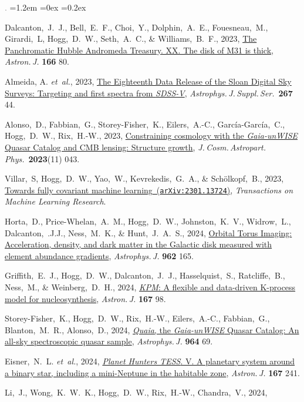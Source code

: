 \documentclass[10pt,letterpaper]{article}
\newcommand{\foreign}[1]{\textsl{#1}}
\newcommand{\etal}{\foreign{et~al.}}
\newcommand{\project}[1]{\textsl{#1}}
\newcommand{\doi}[2]{\href{http://dx.doi.org/#1}{{#2}}}
\newcommand{\arxiv}[2]{\href{http://arxiv.org/abs/#1}{{#2}\ (\texttt{arXiv:#1})}}
\newcommand{\deemph}[1]{\textcolor{grey}{\footnotesize{#1}}}
\newcommand{\pubnumber}[1]{\deemph{{#1}.}}
\newcounter{refpubnum}
\newcommand{\hogglist}{%
    \rightmargin=0in
    \leftmargin=1.2em
    \topsep=0ex
    \partopsep=0pt
    \itemsep=0.2ex
    \parsep=0pt
    \itemindent=-1.0\leftmargin
    \listparindent=0.0\leftmargin
    \settowidth{\labelsep}{~}
    \usecounter{refpubnum}
  }
\begin{document}
\begin{list}{\pubnumber{\therefpubnum}}{\hogglist}
\item
  Dalcanton,~J.~J., Bell,~E.~F., Choi,~Y., Dolphin,~A.~E., Fouesneau,~M., Girardi,~L,
  Hogg,~D.~W., Seth,~A.~C., \& Williams,~B.~F., 2023,
  \doi{10.3847/1538-3881/accc83}{The Panchromatic Hubble Andromeda Treasury. XX. The disk of M31 is thick},
  \textit{Astron.\,J.} \textbf{166} 80.
\item
  Almeida, A. \etal, 2023,
  \doi{10.3847/1538-4365/acda98}{The Eighteenth Data Release of the Sloan Digital Sky Surveys: Targeting and first spectra from \project{SDSS-V}},
  \textit{Astrophys.\,J.\,Suppl.\,Ser.}\ \textbf{267} 44.
\item
  Alonso,~D., Fabbian,~G., Storey-Fisher,~K., Eilers,~A.-C., Garc\'ia-Garc\'ia,~C.,
  Hogg,~D.~W., Rix,~H.-W., 2023,
  \doi{10.1088/1475-7516/2023/11/043}{Constraining cosmology with the \project{Gaia-unWISE} Quasar Catalog and CMB lensing: Structure growth},
  \textit{J.\,Cosm.\,Astropart.\,Phys.}\ \textbf{2023}(11) 043.
\item
Villar,~S, Hogg,~D.~W., Yao,~W., Kevrekedis,~G.~A., \& Sch\"olkopf,~B., 2023,
  \arxiv{2301.13724}{Towards fully covariant machine learning},
  \textit{Transactions on Machine Learning Research}.
\item
  Horta,~D., Price-Whelan,~A.~M., Hogg,~D.~W., Johnston,~K.~V., Widrow,~L., Dalcanton,~.J.J., Ness,~M.~K.,
  \& Hunt,~J.~A.~S., 2024,
  \doi{10.3847/1538-4357/ad16e8}{Orbital Torus Imaging: Acceleration, density, and dark matter in the Galactic disk measured with element abundance gradients},
  \textit{Astrophys.\,J.} \textbf{962} 165.
\item
  Griffith,~E.~J., Hogg,~D.~W., Dalcanton,~J.~J., Hasselquist,~S., Ratcliffe,~B., Ness,~M., \& Weinberg,~D.~H., 2024,
  \doi{10.3847/1538-3881/ad19c7}{\project{KPM}: A flexible and data-driven K-process model for nucleosynthesis},
  \textit{Astron.\,J.} \textbf{167} 98.
\item
  Storey-Fisher,~K., Hogg,~D.~W., Rix,~H.-W., Eilers,~A.-C., Fabbian,~G., Blanton,~M.~R., Alonso,~D., 2024,
  \doi{10.3847/1538-4357/ad1328}{\project{Quaia}, the \project{Gaia-unWISE} Quasar Catalog: An all-sky spectroscopic quasar sample},
  \textit{Astrophys.\,J.} \textbf{964} 69.
\item
  Eisner,~N.~L. \etal, 2024,
  \doi{10.3847/1538-3881/ad1d5c}{\project{Planet Hunters TESS}. V. A planetary system around a binary star, including a mini-Neptune in the habitable zone},
  \textit{Astron.\,J.} \textbf{167} 241.
\item
  Li,~J., Wong,~K.~W.~K., Hogg,~D.~W., Rix,~H.-W., Chandra,~V., 2024,

\end{list}
\end{document}

